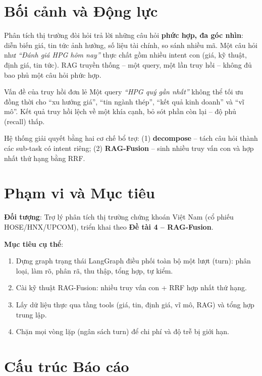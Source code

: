 \documentclass[12pt, a4paper]{report}
\begin{document}
\section{Bối cảnh và Động lực}

Phân tích thị trường đòi hỏi trả lời những câu hỏi \textbf{phức hợp, đa góc nhìn}: diễn biến giá, tin tức ảnh hưởng, số liệu tài chính, so sánh nhiều mã. Một câu hỏi như \textit{``Đánh giá HPG hôm nay''} thực chất gồm nhiều intent con (giá, kỹ thuật, định giá, tin tức). RAG truyền thống -- một query, một lần truy hồi -- không đủ bao phủ một câu hỏi phức hợp.

\begin{casebox}{Vấn đề của truy hồi đơn lẻ}
Một query \textit{``HPG quý gần nhất''} không thể tối ưu đồng thời cho ``xu hướng giá'', ``tin ngành thép'', ``kết quả kinh doanh'' và ``vĩ mô''. Kết quả truy hồi lệch về một khía cạnh, bỏ sót phần còn lại -- độ phủ (recall) thấp.
\end{casebox}

Hệ thống giải quyết bằng hai cơ chế bổ trợ: (1) \textbf{decompose} -- tách câu hỏi thành các sub-task có intent riêng; (2) \textbf{RAG-Fusion} -- sinh nhiều truy vấn con và hợp nhất thứ hạng bằng RRF.

\section{Phạm vi và Mục tiêu}

\noindent\textbf{Đối tượng}: Trợ lý phân tích thị trường chứng khoán Việt Nam (cổ phiếu HOSE/HNX/UPCOM), triển khai theo \textbf{Đề tài 4 -- RAG-Fusion}.

\medskip\noindent\textbf{Mục tiêu cụ thể}:
\begin{enumerate}
  \item Dựng graph trạng thái LangGraph điều phối toàn bộ một lượt (turn): phân loại, làm rõ, phân rã, thu thập, tổng hợp, tự kiểm.
  \item Cài kỹ thuật RAG-Fusion: nhiều truy vấn con + RRF hợp nhất thứ hạng.
  \item Lấy dữ liệu thực qua tầng tools (giá, tin, định giá, vĩ mô, RAG) và tổng hợp trung lập.
  \item Chặn mọi vòng lặp (ngân sách turn) để chi phí và độ trễ bị giới hạn.
\end{enumerate}

\section{Cấu trúc Báo cáo}
\end{document}
